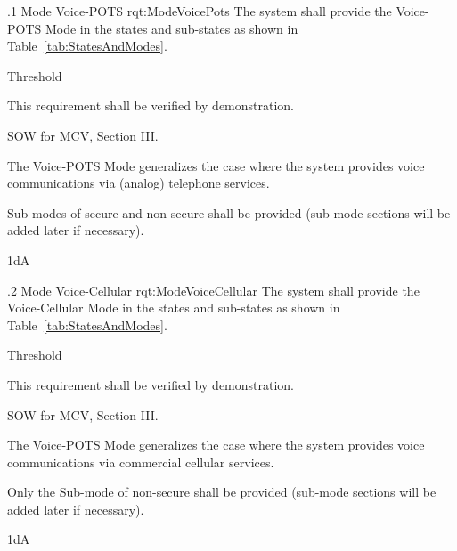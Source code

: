 \ONERQMTVKSA
{\RqtNumberBase.1}
{Mode Voice-POTS}
{rqt:ModeVoicePots}
{The system shall provide the Voice-POTS Mode in the states and sub-states as shown in Table~\ref{tab:StatesAndModes}.}
{
	\item [Phase 1] Threshold
}
{This requirement shall be verified by demonstration.}
{
	\item [\cite{ref:MCV_SOW}] SOW for MCV, Section III.
}
{
	\item The Voice-POTS Mode generalizes the case where the system provides voice communications via \POTS (analog) telephone services.
	\item Sub-modes of secure and non-secure shall be provided (sub-mode sections will be added later if necessary).
}
{1dA}


\ONERQMTVKSA
{\RqtNumberBase.2}
{Mode Voice-Cellular}
{rqt:ModeVoiceCellular}
{The system shall provide the Voice-Cellular Mode in the states and sub-states as shown in Table~\ref{tab:StatesAndModes}.}
{
	\item [Phase 1] Threshold
}
{This requirement shall be verified by demonstration.}
{
	\item [\cite{ref:MCV_SOW}] SOW for MCV, Section III.
}
{
	\item The Voice-POTS Mode generalizes the case where the system provides voice communications via commercial cellular services.
	\item Only the Sub-mode of non-secure shall be provided (sub-mode sections will be added later if necessary). 
}
{1dA}


